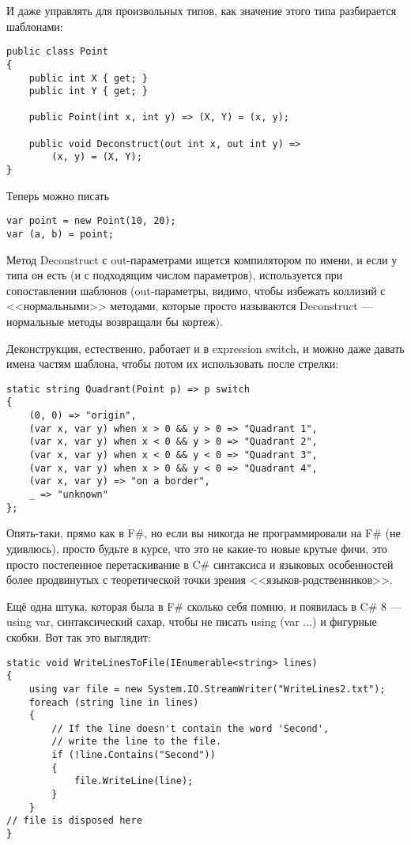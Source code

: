 \documentclass[a5paper]{article}
\begin{document}
И даже управлять для произвольных типов, как значение этого типа разбирается шаблонами:

\begin{verbatim}
public class Point
{
    public int X { get; }
    public int Y { get; }

    public Point(int x, int y) => (X, Y) = (x, y);

    public void Deconstruct(out int x, out int y) =>
        (x, y) = (X, Y);
}
\end{verbatim}

Теперь можно писать

\begin{verbatim}
var point = new Point(10, 20);
var (a, b) = point;
\end{verbatim}

Метод Deconstruct с out-параметрами ищется компилятором по имени, и если у типа он есть (и с подходящим числом параметров), используется при сопоставлении шаблонов (out-параметры, видимо, чтобы избежать коллизий с <<нормальными>> методами, которые просто называются Deconstruct --- нормальные методы возвращали бы кортеж).

Деконструкция, естественно, работает и в expression switch, и можно даже давать имена частям шаблона, чтобы потом их использовать после стрелки:

\begin{verbatim}
static string Quadrant(Point p) => p switch
{
    (0, 0) => "origin",
    (var x, var y) when x > 0 && y > 0 => "Quadrant 1",
    (var x, var y) when x < 0 && y > 0 => "Quadrant 2",
    (var x, var y) when x < 0 && y < 0 => "Quadrant 3",
    (var x, var y) when x > 0 && y < 0 => "Quadrant 4",
    (var x, var y) => "on a border",
    _ => "unknown"
};
\end{verbatim}

Опять-таки, прямо как в F\#, но если вы никогда не программировали на F\# (не удивлюсь), просто будьте в курсе, что это не какие-то новые крутые фичи, это просто постепенное перетаскивание в C\# синтаксиса и языковых особенностей более продвинутых с теоретической точки зрения <<языков-родственников>>.

Ещё одна штука, которая была в F\# сколько себя помню, и появилась в C\# 8 --- using var, синтаксический сахар, чтобы не писать using (var ...) и фигурные скобки. Вот так это выглядит:

\begin{verbatim}
static void WriteLinesToFile(IEnumerable<string> lines)
{
    using var file = new System.IO.StreamWriter("WriteLines2.txt");
    foreach (string line in lines)
    {
        // If the line doesn't contain the word 'Second', 
        // write the line to the file.
        if (!line.Contains("Second"))
        {
            file.WriteLine(line);
        }
    }
// file is disposed here
}
\end{verbatim}
\end{document}
